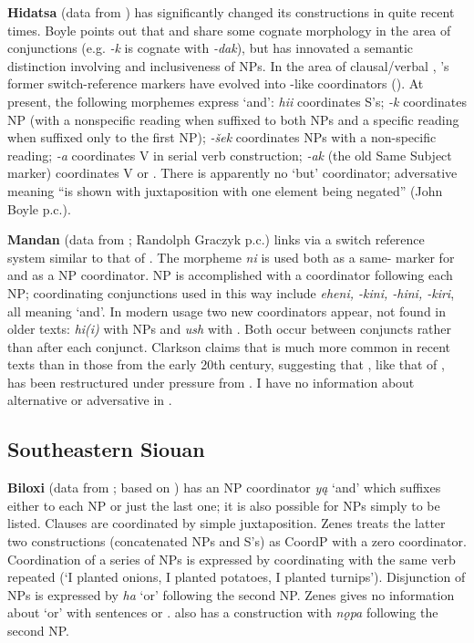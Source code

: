 \documentclass[output=paper]{LSP/langsci}
\begin{document}
\textbf{Hidatsa} (data from \citealt{Boyle2005,Boyle2007,Boyle2011}) has significantly changed its  constructions in quite recent times. Boyle points out that  and  share some cognate morphology in the area of conjunctions (e.g.  \textit{-k} is cognate with  \textit{-dak}), but  has innovated a semantic distinction involving  and inclusiveness of NPs. In the area of clausal/verbal , 's former switch-reference markers have evolved into -like coordinators (\citealt{Boyle2011}). At present, the following morphemes express `and': \textit{hii} coordinates S's; \textit{-k} coordinates NP (with a nonspecific reading when suffixed to both NPs and a specific reading when suffixed only to the first NP); \textit{-\v{s}ek} coordinates NPs with a non-specific reading; \textit{-a} coordinates V in serial verb construction; \textit{-ak} (the old Same Subject marker) coordinates V or . There is apparently no `but' coordinator; adversative meaning ``is shown with juxtaposition with one element being negated'' (John Boyle p.c.).

\textbf{Mandan} (data from \citealt{Clarkson2012}; Randolph Graczyk p.c.) links  via a switch reference system similar to that of . The morpheme \textit{ni} is used both as a same- marker for  and as a NP coordinator. NP  is accomplished with a coordinator following each NP; coordinating conjunctions used in this way include \textit{eheni, -kini, -hini, -kiri}, all meaning `and'. In modern usage two new coordinators appear, not found in older texts: \textit{hi(i)} with NPs and \textit{ush} with . Both occur between conjuncts rather than after each conjunct. Clarkson claims that  is much more common in recent texts than in those from the early 20th century, suggesting that  , like that of , has been restructured under pressure from . I have no information about alternative or adversative  in .  

\subsection{Southeastern Siouan}
 
\textbf{Biloxi} (data from \citealt{Zenes2009}; based on \citealt{DorseySwanton1912}) has an NP coordinator \textit{y\k{a}} `and' which suffixes either to each NP or just the last one; it is also possible for NPs simply to be listed. Clauses are coordinated by simple juxtaposition. Zenes treats the latter two constructions (concatenated NPs and S's) as CoordP with a zero coordinator. Coordination of a series of  NPs is expressed by coordinating  with the same verb repeated (`I planted onions, I planted potatoes, I planted turnips'). Disjunction of NPs is expressed by \textit{ha} `or' following the second NP. Zenes gives no information about `or' with sentences or .  also has a  construction with \textit{n\k{o}pa} following the second NP.
\end{document}
